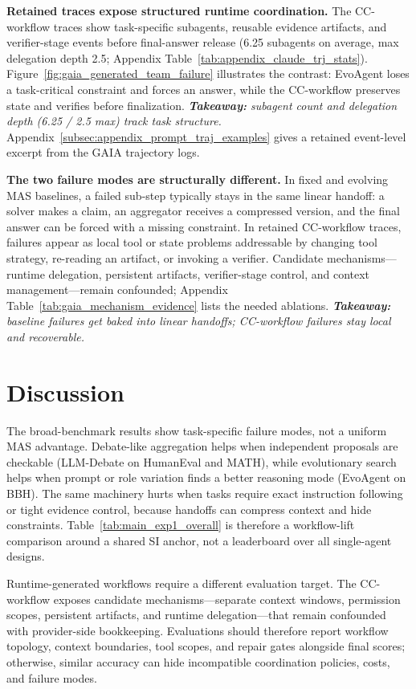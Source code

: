 \noindent\textbf{Retained traces expose structured runtime coordination.} The CC-workflow traces show task-specific subagents, reusable evidence artifacts, and verifier-stage events before final-answer release (6.25 subagents on average, max delegation depth 2.5; Appendix Table~\ref{tab:appendix_claude_trj_stats}). Figure~\ref{fig:gaia_generated_team_failure} illustrates the contrast: EvoAgent loses a task-critical constraint and forces an answer, while the CC-workflow preserves state and verifies before finalization. \emph{\textbf{Takeaway:} subagent count and delegation depth (6.25 / 2.5 max) track task structure.}
Appendix~\ref{subsec:appendix_prompt_traj_examples} gives a retained event-level excerpt from the GAIA trajectory logs.

\noindent\textbf{The two failure modes are structurally different.} In fixed and evolving MAS baselines, a failed sub-step typically stays in the same linear handoff: a solver makes a claim, an aggregator receives a compressed version, and the final answer can be forced with a missing constraint. In retained CC-workflow traces, failures appear as local tool or state problems addressable by changing tool strategy, re-reading an artifact, or invoking a verifier. Candidate mechanisms---runtime delegation, persistent artifacts, verifier-stage control, and context management---remain confounded; Appendix Table~\ref{tab:gaia_mechanism_evidence} lists the needed ablations. \emph{\textbf{Takeaway:} baseline failures get baked into linear handoffs; CC-workflow failures stay local and recoverable.}

\section{Discussion}
The broad-benchmark results show task-specific failure modes, not a uniform MAS advantage. Debate-like aggregation helps when independent proposals are checkable (LLM-Debate on HumanEval and MATH), while evolutionary search helps when prompt or role variation finds a better reasoning mode (EvoAgent on BBH). The same machinery hurts when tasks require exact instruction following or tight evidence control, because handoffs can compress context and hide constraints. Table~\ref{tab:main_exp1_overall} is therefore a workflow-lift comparison around a shared SI anchor, not a leaderboard over all single-agent designs.

Runtime-generated workflows require a different evaluation target. The CC-workflow exposes candidate mechanisms---separate context windows, permission scopes, persistent artifacts, and runtime delegation---that remain confounded with provider-side bookkeeping. Evaluations should therefore report workflow topology, context boundaries, tool scopes, and repair gates alongside final scores; otherwise, similar accuracy can hide incompatible coordination policies, costs, and failure modes.

